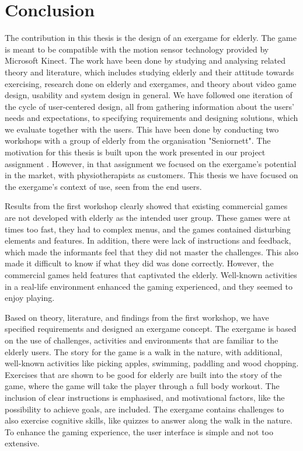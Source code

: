 \chapter{Conclusion}

The contribution in this thesis is the design of an exergame for elderly. The game is meant to be compatible with the motion sensor technology provided by Microsoft Kinect. The work have been done by studying and analysing related theory and literature, which includes studying elderly and their attitude towards exercising, research done on elderly and exergames, and theory about video game design, usability and system design in general. We have followed one iteration of the cycle of user-centered design, all from gathering information about the users' needs and expectations, to specifying requirements and designing solutions, which we evaluate together with the users. This have been done by conducting two workshops with a group of elderly from the organisation "Seniornett". The motivation for this thesis is built upon the work presented in our project assignment \cite{project}. However, in that assignment we focused on the exergame's potential in the market, with physiotherapists as customers. This thesis we have focused on the exergame's context of use, seen from the end users. 

Results from the first workshop clearly showed that existing commercial games are not developed with elderly as the intended user group. These games were at times too fast, they had to complex menus, and the games contained disturbing elements and features. In addition, there were lack of instructions and feedback, which made the informants feel that they did not master the challenges. This also made it difficult to know if what they did was done correctly. However, the commercial games held features that captivated the elderly. Well-known activities in a real-life environment enhanced the gaming experienced, and they seemed to enjoy playing. 

Based on theory, literature, and findings from the first workshop, we have specified requirements and designed an exergame concept. The exergame is based on the use of challenges, activities and environments that are familiar to the elderly users. The story for the game is a walk in the nature, with additional, well-known activities like picking apples, swimming, paddling and wood chopping. Exercises that are shown to be good for elderly are built into the story of the game, where the game will take the player through a full body workout. The inclusion of clear instructions is emphasised, and motivational factors, like the possibility to achieve goals, are included. The exergame contains challenges to also exercise cognitive skills, like quizzes to answer along the walk in the nature. To enhance the gaming experience, the user interface is simple and not too extensive.

